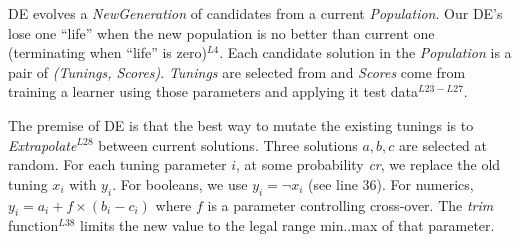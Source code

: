 





DE evolves a {\em NewGeneration} of candidates  from
a current {\em Population}.  Our DE's lose one ``life''
when the new population is no better than  current one (terminating when ``life'' is zero)$^{L4}$.
Each candidate solution in the {\em Population}  
is a pair of {\em (Tunings, Scores)}.  {\em Tunings} are selected from
 and {\em Scores} come from training a learner using those parameters
and applying it     test data$^{L23-L27}$.

The premise of DE  is that the best way to mutate the existing tunings
is to {\em Extrapolate}$^{L28}$
between current solutions.  Three solutions $a,b,c$ are selected at random.
For each tuning parameter $i$, at some probability {\em cr}, we replace
the old tuning $x_i$ with $y_i$. For booleans, we use $y_i= \neg x_i$ (see line 36). For numerics, $y_i = a_i+f \times (b_i - c_i)$   where $f$ is a parameter
controlling  cross-over.  The {\em trim} function$^{L38}$ limits the new
value to the legal range min..max of that parameter.
 
